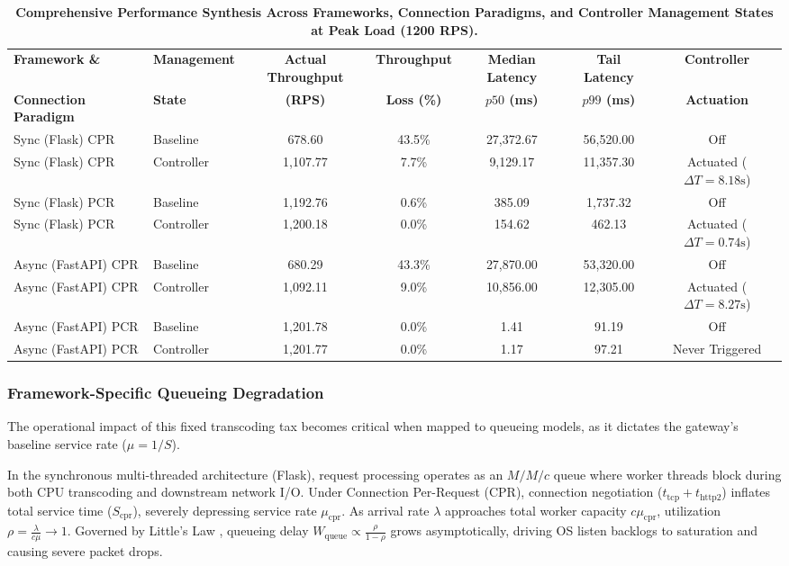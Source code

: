 \documentclass{ieeeaccess}
\begin{document}
\begin{table}[htbp]
	\centering
	\caption{\textbf{Comprehensive Performance Synthesis Across Frameworks, Connection Paradigms, and Controller Management States at Peak Load (1200 RPS).}}
	\label{tab:master-synthesis}
	\setlength{\tabcolsep}{4pt}
	\begin{tabular}{llccccc}
		\hline
		\textbf{Framework \&} & \textbf{Management} & \textbf{Actual Throughput} & \textbf{Throughput} & \textbf{Median Latency} & \textbf{Tail Latency} & \textbf{Controller} \\
		\textbf{Connection Paradigm} & \textbf{State} & \textbf{(RPS)} & \textbf{Loss (\%)} & \textbf{{$p50$} (ms)} & \textbf{{$p99$} (ms)} & \textbf{Actuation} \\
		\hline
		Sync (Flask) CPR & Baseline & 678.60 & 43.5\% & 27,372.67 & 56,520.00 & Off \\
		Sync (Flask) CPR & Controller & 1,107.77 & 7.7\% & 9,129.17 & 11,357.30 & Actuated ($\Delta T = 8.18\text{s}$) \\
		\hline
		Sync (Flask) PCR & Baseline & 1,192.76 & 0.6\% & 385.09 & 1,737.32 & Off \\
		Sync (Flask) PCR & Controller & 1,200.18 & 0.0\% & 154.62 & 462.13 & Actuated ($\Delta T = 0.74\text{s}$) \\
		\hline
		Async (FastAPI) CPR & Baseline & 680.29 & 43.3\% & 27,870.00 & 53,320.00 & Off \\
		Async (FastAPI) CPR & Controller & 1,092.11 & 9.0\% & 10,856.00 & 12,305.00 & Actuated ($\Delta T = 8.27\text{s}$) \\
		\hline
		Async (FastAPI) PCR & Baseline & 1,201.78 & 0.0\% & 1.41 & 91.19 & Off \\
		Async (FastAPI) PCR & Controller & 1,201.77 & 0.0\% & 1.17 & 97.21 & Never Triggered \\
		\hline
	\end{tabular}
\end{table}

\subsubsection{Framework-Specific Queueing Degradation}
The operational impact of this fixed transcoding tax becomes critical when mapped to queueing models, as it dictates the gateway's baseline service rate ($\mu = 1/S$). 

In the synchronous multi-threaded architecture (Flask), request processing operates as an $M/M/c$ queue where worker threads block during both CPU transcoding and downstream network I/O. Under Connection Per-Request (CPR), connection negotiation ($t_{\text{tcp}} + t_{\text{http2}}$) inflates total service time ($S_{\text{cpr}}$), severely depressing service rate $\mu_{\text{cpr}}$. As arrival rate $\lambda$ approaches total worker capacity $c\mu_{\text{cpr}}$, utilization $\rho = \frac{\lambda}{c\mu} \to 1$. Governed by Little's Law \cite{little2011or}, queueing delay $W_{\text{queue}} \propto \frac{\rho}{1-\rho}$ grows asymptotically, driving OS listen backlogs to saturation and causing severe packet drops.
\end{document}

